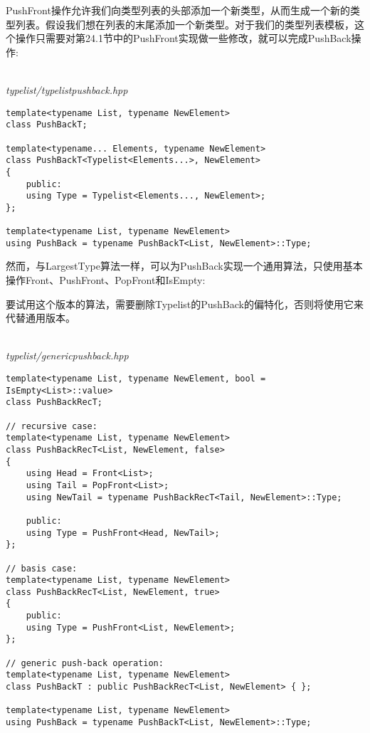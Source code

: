 
PushFront操作允许我们向类型列表的头部添加一个新类型，从而生成一个新的类型列表。假设我们想在列表的末尾添加一个新类型。对于我们的类型列表模板，这个操作只需要对第24.1节中的PushFront实现做一些修改，就可以完成PushBack操作:

\hspace*{\fill} \\ %
\noindent
\textit{typelist/typelistpushback.hpp}
\begin{lstlisting}[style=styleCXX]
template<typename List, typename NewElement>
class PushBackT;

template<typename... Elements, typename NewElement>
class PushBackT<Typelist<Elements...>, NewElement>
{
	public:
	using Type = Typelist<Elements..., NewElement>;
};

template<typename List, typename NewElement>
using PushBack = typename PushBackT<List, NewElement>::Type;
\end{lstlisting}

然而，与LargestType算法一样，可以为PushBack实现一个通用算法，只使用基本操作Front、PushFront、PopFront和IsEmpty:

\begin{tcolorbox}[colback=webgreen!5!white,colframe=webgreen!75!black]
\hspace*{0.75cm}要试用这个版本的算法，需要删除Typelist的PushBack的偏特化，否则将使用它来代替通用版本。
\end{tcolorbox}

\hspace*{\fill} \\ %
\noindent
\textit{typelist/genericpushback.hpp}
\begin{lstlisting}[style=styleCXX]
template<typename List, typename NewElement, bool = IsEmpty<List>::value>
class PushBackRecT;

// recursive case:
template<typename List, typename NewElement>
class PushBackRecT<List, NewElement, false>
{
	using Head = Front<List>;
	using Tail = PopFront<List>;
	using NewTail = typename PushBackRecT<Tail, NewElement>::Type;
	
	public:
	using Type = PushFront<Head, NewTail>;
};

// basis case:
template<typename List, typename NewElement>
class PushBackRecT<List, NewElement, true>
{
	public:
	using Type = PushFront<List, NewElement>;
};

// generic push-back operation:
template<typename List, typename NewElement>
class PushBackT : public PushBackRecT<List, NewElement> { };

template<typename List, typename NewElement>
using PushBack = typename PushBackT<List, NewElement>::Type;
\end{lstlisting}

